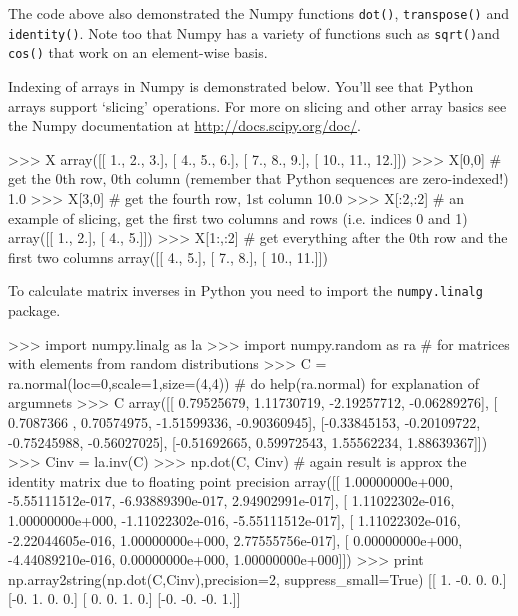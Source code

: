 The code above also demonstrated the Numpy functions \lstinline!dot()!,
\lstinline!transpose()! and \lstinline!identity()!. Note too that Numpy
has a variety of functions such as \lstinline!sqrt()!and
\lstinline!cos()! that work on an element-wise basis.

Indexing of arrays in Numpy is demonstrated below. You'll see that
Python arrays support `slicing' operations. For more on slicing and
other array basics see the Numpy documentation at
\href{http://docs.scipy.org/doc/}{http://docs.scipy.org/doc/}.

\begin{python}
>>> X
array([[  1.,   2.,   3.],
       [  4.,   5.,   6.],
       [  7.,   8.,   9.],
       [ 10.,  11.,  12.]])
>>> X[0,0] # get the 0th row, 0th column (remember that Python sequences are zero-indexed!)
1.0
>>> X[3,0] # get the fourth row, 1st column
10.0
>>> X[:2,:2]  # an example of slicing, get the first two columns and rows (i.e. indices 0 and 1)
array([[ 1.,  2.],
       [ 4.,  5.]])
>>> X[1:,:2] # get everything after the 0th row and  the first two columns
array([[  4.,   5.],
       [  7.,   8.],
       [ 10.,  11.]])
\end{python}
To calculate matrix inverses in Python you need to import the
\lstinline!numpy.linalg! package.

\begin{python}
>>> import numpy.linalg as la
>>> import numpy.random as ra  # for matrices with elements from random distributions
>>> C = ra.normal(loc=0,scale=1,size=(4,4)) # do help(ra.normal) for explanation of argumnets
>>> C
array([[ 0.79525679,  1.11730719, -2.19257712, -0.06289276],
       [ 0.7087366 ,  0.70574975, -1.51599336, -0.90360945],
       [-0.33845153, -0.20109722, -0.75245988, -0.56027025],
       [-0.51692665,  0.59972543,  1.55562234,  1.88639367]])
>>> Cinv = la.inv(C)
>>> np.dot(C, Cinv) # again result is approx the identity matrix due to floating point precision
array([[ 1.00000000e+000, -5.55111512e-017, -6.93889390e-017,  2.94902991e-017],
       [ 1.11022302e-016,  1.00000000e+000, -1.11022302e-016, -5.55111512e-017],
       [ 1.11022302e-016, -2.22044605e-016,  1.00000000e+000,  2.77555756e-017],
       [ 0.00000000e+000, -4.44089210e-016,  0.00000000e+000,  1.00000000e+000]])
>>> print np.array2string(np.dot(C,Cinv),precision=2, suppress_small=True)
[[ 1. -0.  0.  0.]
 [-0.  1.  0.  0.]
 [ 0.  0.  1.  0.]
 [-0. -0. -0.  1.]]
\end{python}





